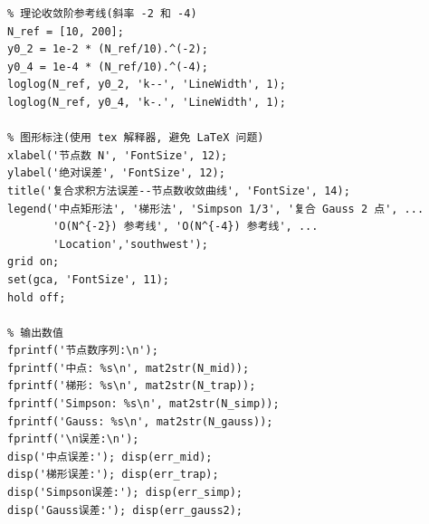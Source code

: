 \documentclass[12pt,a4paper]{ctexart}
\begin{document}
\begin{lstlisting}
% 理论收敛阶参考线(斜率 -2 和 -4)
N_ref = [10, 200];
y0_2 = 1e-2 * (N_ref/10).^(-2);
y0_4 = 1e-4 * (N_ref/10).^(-4);
loglog(N_ref, y0_2, 'k--', 'LineWidth', 1);
loglog(N_ref, y0_4, 'k-.', 'LineWidth', 1);

% 图形标注(使用 tex 解释器, 避免 LaTeX 问题)
xlabel('节点数 N', 'FontSize', 12);
ylabel('绝对误差', 'FontSize', 12);
title('复合求积方法误差--节点数收敛曲线', 'FontSize', 14);
legend('中点矩形法', '梯形法', 'Simpson 1/3', '复合 Gauss 2 点', ...
       'O(N^{-2}) 参考线', 'O(N^{-4}) 参考线', ...
       'Location','southwest');
grid on;
set(gca, 'FontSize', 11);
hold off;

% 输出数值
fprintf('节点数序列:\n');
fprintf('中点: %s\n', mat2str(N_mid));
fprintf('梯形: %s\n', mat2str(N_trap));
fprintf('Simpson: %s\n', mat2str(N_simp));
fprintf('Gauss: %s\n', mat2str(N_gauss));
fprintf('\n误差:\n');
disp('中点误差:'); disp(err_mid);
disp('梯形误差:'); disp(err_trap);
disp('Simpson误差:'); disp(err_simp);
disp('Gauss误差:'); disp(err_gauss2);
\end{lstlisting}
\end{document}
